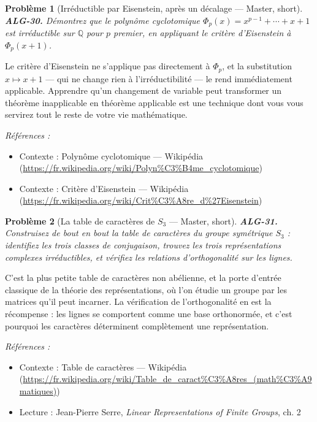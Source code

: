 \documentclass[11pt]{article}
\newtheorem{problem}{Problème}
\newenvironment{refs}{\par\small\noindent\emph{Références :}\begin{itemize}\setlength\itemsep{0pt}}{\end{itemize}\normalsize}
\begin{document}
\bigskip

\begin{problem}[{Irréductible par Eisenstein, après un décalage --- Master, short}]
\textbf{ALG-30.} Démontrez que le polynôme cyclotomique $ \Phi_p(x) = x^{p-1} + \cdots + x + 1 $ est irréductible sur $ \mathbb{Q} $ pour $ p $ premier, en appliquant le critère d'Eisenstein à $ \Phi_p(x+1) $.
\end{problem}

\noindent Le critère d'Eisenstein ne s'applique pas directement à $ \Phi_p $, et la substitution $ x \mapsto x+1 $ --- qui ne change rien à l'irréductibilité --- le rend immédiatement applicable. Apprendre qu'un changement de variable peut transformer un théorème inapplicable en théorème applicable est une technique dont vous vous servirez tout le reste de votre vie mathématique.

\begin{refs}
\item Contexte : Polynôme cyclotomique --- Wikipédia (\url{https://fr.wikipedia.org/wiki/Polyn%C3%B4me_cyclotomique})
\item Contexte : Critère d'Eisenstein --- Wikipédia (\url{https://fr.wikipedia.org/wiki/Crit%C3%A8re_d%27Eisenstein})
\end{refs}

\bigskip

\begin{problem}[{La table de caractères de $ S_3 $ --- Master, short}]
\textbf{ALG-31.} Construisez de bout en bout la table de caractères du groupe symétrique $ S_3 $ : identifiez les trois classes de conjugaison, trouvez les trois représentations complexes irréductibles, et vérifiez les relations d'orthogonalité sur les lignes.
\end{problem}

\noindent C'est la plus petite table de caractères non abélienne, et la porte d'entrée classique de la théorie des représentations, où l'on étudie un groupe par les matrices qu'il peut incarner. La vérification de l'orthogonalité en est la récompense : les lignes se comportent comme une base orthonormée, et c'est pourquoi les caractères déterminent complètement une représentation.

\begin{refs}
\item Contexte : Table de caractères --- Wikipédia (\url{https://fr.wikipedia.org/wiki/Table_de_caract%C3%A8res_(math%C3%A9matiques)})
\item Lecture : Jean-Pierre Serre, \textit{Linear Representations of Finite Groups}, ch. 2
\end{refs}
\end{document}
